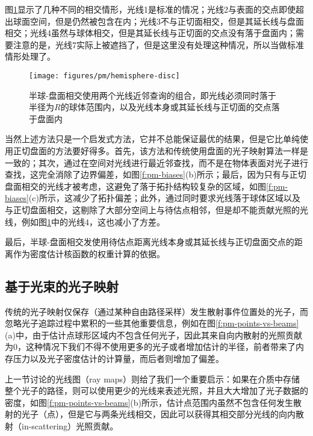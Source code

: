 图\ref{f:pm-hemisphere-disc}显示了几种不同的相交情形，光线1是标准的情况；光线2与表面的交点即使超出球面空间，但是仍然被包含在内；光线3不与正切面相交，但是其延长线与盘面相交；光线4虽然与球体相交，但是其延长线与正切面的交点没有落于盘面内；需要注意的是，光线7实际上被遮挡了，但是这里没有处理这种情况，所以当做标准情形处理了。

\begin{figure}
	\sidecaption
	\texttt{[image: figures/pm/hemisphere-disc]}
	\caption{半球-盘面相交使用两个光线近邻查询的组合，即光线必须同时落于半径为$R$的球体范围内，以及光线本身或其延长线与正切面的交点落于盘面内}
	\label{f:pm-hemisphere-disc}
\end{figure}

当然上述方法只是一个启发式方法，它并不总能保证最优的结果，但是它比单纯使用正切盘面的方法\cite{a:AParticlePathbasedMethodforMonteCarloDensityEstimation}要好得多。首先，该方法和传统使用盘面的光子映射算法一样是一致的；其次，通过在空间对光线进行最近邻查找，而不是在物体表面对光子进行查找，这完全消除了边界偏差，如图\ref{f:pm-biases}(b)所示；最后，因为只有与正切盘面相交的光线才被考虑，这避免了落于拓扑结构较复杂的区域，如图\ref{f:pm-biases}(c)所示，这减少了拓扑偏差；此外，通过同时要求光线落于球体区域以及与正切盘面相交，这剔除了大部分空间上与待估点相邻，但是却不能贡献光照的光线，例如图\ref{f:pm-hemisphere-disc}中的光线4，这也减小了方差。

最后，半球-盘面相交发使用待估点距离光线本身或其延长线与正切盘面交点的距离作为密度估计核函数的权重计算的依据。






\subsection{基于光束的光子映射}
传统的光子映射仅保存（通过某种自由路径采样）发生散射事件位置处的光子，而忽略光子追踪过程中累积的一些其他重要信息，例如在图\ref{f:pm-points-vs-beams}(a)中，由于估计点球形区域内不包含任何光子，因此其来自向内散射的光照贡献为0，这种情况下我们不得不使用更多的光子或者增加估计的半径，前者带来了内存压力以及光子密度估计的计算量，而后者则增加了偏差。

上一节讨论的光线图（ray maps）则给了我们一个重要启示：如果在介质中存储整个光子的路径，则可以使用更少的光线来表述光照，并且大大增加了光子数据的密度，如图\ref{f:pm-points-vs-beams}(b)所示，估计点范围内虽然不包含任何发生散射的光子（点），但是它与两条光线相交，因此可以获得其相交部分光线的向内散射（in-scattering）光照贡献。

